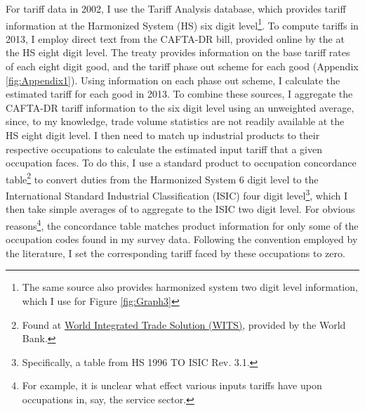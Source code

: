 \documentclass[12pt]{article}
\begin{document}
For tariff data in 2002, 
I use the \citet{wtotariff} Tariff Analysis database, which provides tariff information 
at the Harmonized System (HS) six digit level\footnote{The same source
also provides harmonized system two digit level information,
which I use for Figure \ref{fig:Graph3}}. To compute tariffs in 2013, 
I employ direct text from the CAFTA-DR bill, provided online by the 
\citet{ustraderep} at the HS eight digit level. The treaty provides
information on the base tariff rates of each eight digit good, and the tariff phase out
scheme for each good (Appendix \ref{fig:Appendix1}).
Using information on each phase out scheme, I calculate the estimated tariff
for each good in 2013. To combine these sources, I aggregate
the CAFTA-DR tariff information to the six digit level using an unweighted average, 
since, to my knowledge, trade volume statistics are not readily available at the HS eight digit level.
I then need to match up industrial products to their respective occupations to calculate
the estimated input tariff that a given occupation faces. 
To do this, I use a standard product to occupation concordance table\footnote{Found at 
\href{http://wits.worldbank.org/product_concordance.html}{World Integrated Trade Solution (WITS)}, 
provided by the World Bank.} to convert duties from the Harmonized System 6 digit level to the 
International Standard Industrial Classification (ISIC) four digit 
level\footnote{Specifically, a table from HS 1996 TO ISIC Rev. 3.1.}, which I then take 
simple averages of to aggregate to the ISIC two digit level.
For obvious reasons\footnote{For example, it is unclear what effect various inputs tariffs have
upon occupations in, say, the service sector.}, the concordance table matches product information
for only some of the occupation codes found in my survey data. Following the convention employed 
by the literature, I set the corresponding tariff faced by these occupations to zero.
\end{document}
